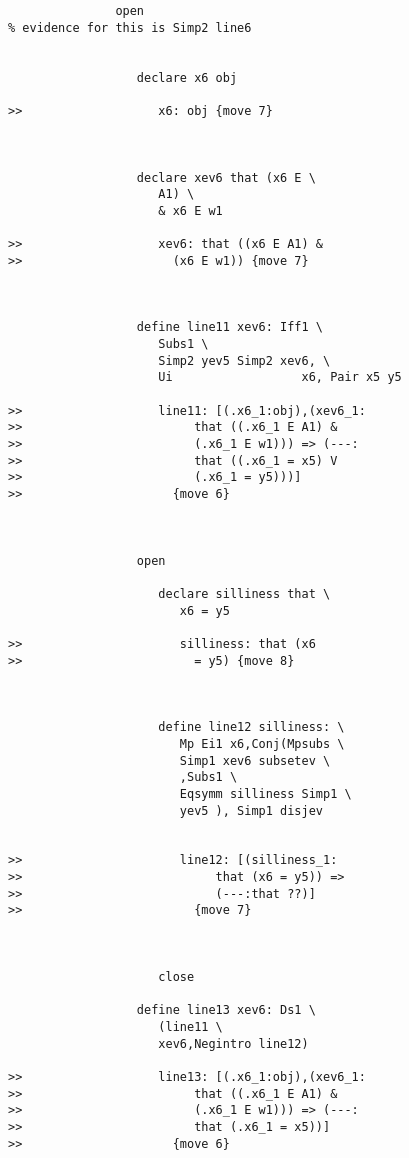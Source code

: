 \documentclass[12pt]{article}
\begin{document}
\begin{verbatim}
               open
% evidence for this is Simp2 line6


                  declare x6 obj

>>                   x6: obj {move 7}



                  declare xev6 that (x6 E \
                     A1) \
                     & x6 E w1

>>                   xev6: that ((x6 E A1) &
>>                     (x6 E w1)) {move 7}



                  define line11 xev6: Iff1 \
                     Subs1 \
                     Simp2 yev5 Simp2 xev6, \
                     Ui                  x6, Pair x5 y5

>>                   line11: [(.x6_1:obj),(xev6_1:
>>                        that ((.x6_1 E A1) &
>>                        (.x6_1 E w1))) => (---:
>>                        that ((.x6_1 = x5) V
>>                        (.x6_1 = y5)))]
>>                     {move 6}



                  open

                     declare silliness that \
                        x6 = y5

>>                      silliness: that (x6
>>                        = y5) {move 8}



                     define line12 silliness: \
                        Mp Ei1 x6,Conj(Mpsubs \
                        Simp1 xev6 subsetev \
                        ,Subs1 \
                        Eqsymm silliness Simp1 \
                        yev5 ), Simp1 disjev


>>                      line12: [(silliness_1:
>>                           that (x6 = y5)) =>
>>                           (---:that ??)]
>>                        {move 7}



                     close

                  define line13 xev6: Ds1 \
                     (line11 \
                     xev6,Negintro line12)

>>                   line13: [(.x6_1:obj),(xev6_1:
>>                        that ((.x6_1 E A1) &
>>                        (.x6_1 E w1))) => (---:
>>                        that (.x6_1 = x5))]
>>                     {move 6}




\end{verbatim}
\end{document}
